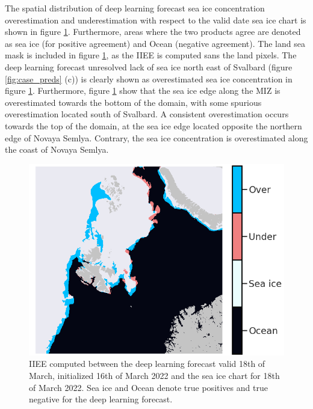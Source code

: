 \documentclass[../main/thesis.tex]{subfiles}
\begin{document}
The spatial distribution of deep learning forecast sea ice concentration overestimation and underestimation \citep{Goessling2016} with respect to the valid date sea ice chart is shown in figure \ref{fig:case_iiee}. Furthermore, areas where the two products agree are denoted as sea ice (for positive agreement) and Ocean (negative agreement). The land sea mask is included in figure \ref{fig:case_iiee}, as the IIEE is computed sans the land pixels. The deep learning forecast unresolved lack of sea ice north east of Svalbard (figure \ref{fig:case_preds} (c)) is clearly shown as overestimated sea ice concentration in figure \ref{fig:case_iiee}. Furthermore, figure \ref{fig:case_iiee} show that the sea ice edge along the MIZ is overestimated towards the bottom of the domain, with some spurious overestimation located south of Svalbard. A consistent overestimation occurs towards the top of the domain, at the sea ice edge located opposite the northern edge of Novaya Semlya. Contrary, the sea ice concentration is overestimated along the coast of Novaya Semlya. 

\begin{figure}
    \centering
    \includegraphics[width=\textwidth]{iiee}
    \caption{\label{fig:case_iiee}IIEE computed between the deep learning forecast valid 18th of March, initialized 16th of March 2022 and the sea ice chart for 18th of March 2022. Sea ice and Ocean denote true positives and true negative for the deep learning forecast.}
\end{figure}




\biblio
\end{document}
